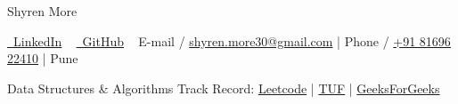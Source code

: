 \documentclass[a4,10pt]{article}
\begin{document}

\begin{flushleft}

    \begin{minipage}[b]{0.5\textwidth}
    {\Huge Shyren More} \\ 
    \end{minipage}%

    \faLinkedin \href{https://linkedin.com/in/shyrenmore/}{\raisebox{-0.2\height}\ LinkedIn} ~ 
    \faGithub \href{https://github.com/ShyrenMore}
    {\raisebox{-0.2\height}\ GitHub} ~ 
    E-mail / \href{mailto:shyren.more30@gmail.com}{shyren.more30@gmail.com} | Phone / \href{tel:8169622410}{+91 81696 22410} | Pune
  

    {Data Structures \& Algorithms Track Record}:  
     \href{https://leetcode.com/shyren_more/}{Leetcode} |
     \href{https://takeuforward.org/plus/profile/shyren_more}{TUF} | 
     \href{https://www.geeksforgeeks.org/user/shyrenmore30/?utm_source=geeksforgeeks&utm_medium=colleges&utm_campaign=users}{GeeksForGeeks} ~
    
\end{flushleft}
             
             
    
\end{document}
